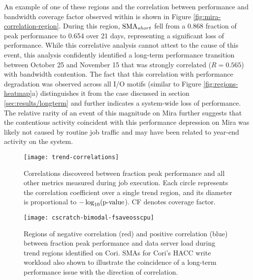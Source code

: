 An example of one of these regions and the correlation between performance and bandwidth coverage factor observed within is shown in Figure \ref{fig:mira-correlation-region}.
During this region, $\textup{SMA}_{short}$ fell from a 0.868 fraction of peak performance to 0.654 over 21 days, representing a significant loss of performance.
While this correlative analysis cannot attest to the cause of this event, this analysis confidently identified a long-term performance transition between October 25 and November 15 that was strongly correlated ($R = 0.565$) with bandwidth contention.
The fact that this correlation with performance degradation was observed across all I/O motifs (similar to Figure \ref{fig:regions-heatmap}a) distinguishes it from the case discussed in section \ref{sec:results/longterm} and further indicates a system-wide loss of performance.
The relative rarity of an event of this magnitude on Mira further suggests that the contentious activity coincident with this performance depression on Mira was likely not caused by routine job traffic and may have been related to year-end activity on the system.

\begin{figure}
    \centering
    \texttt{[image: trend-correlations]}
    \vspace{-.35in}
    \caption{Correlations discovered between fraction peak performance and all other metrics measured during job execution.
    Each circle represents the correlation coefficient over a single trend region, and its diameter is proportional to $-\log_{10}(\textup{p-value}$).
    CF denotes coverage factor.}
    \label{fig:trend-correlations}
\end{figure}


\begin{figure}
    \centering
    \texttt{[image: cscratch-bimodal-fsaveosscpu]}
    \vspace{-.35in}
    \caption{Regions of negative correlation (red) and positive correlation (blue) between fraction peak performance and data server load during trend regions identified on Cori.
    SMAs for Cori's HACC write workload also shown to illustrate the coincidence of a long-term performance issue with the direction of correlation.}
    \label{fig:cscratch-bimodal-fsaveosscpu}
\end{figure}

